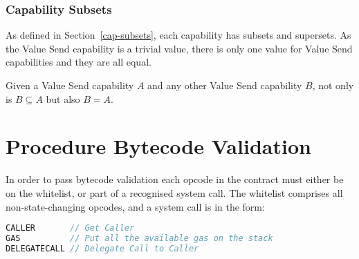 \documentclass[english,a4paper]{article}
\let\oldparagraph\subsubsection
\renewcommand{\subsubsection}[1]{\oldparagraph{#1}\mbox{}}
\begin{document}
\subsubsection{Capability Subsets}
As defined in Section~\ref{cap-subsets}, each capability has subsets and
supersets. As the Value Send capability is a trivial value, there is only one
value for Value Send capabilities and they are all equal.

Given a Value Send capability $A$ and any other Value Send capability $B$, not
only is $B \subseteq A$ but also $B = A$.

\section{Procedure Bytecode Validation}\label{bytecode-validation}
In order to pass bytecode validation each opcode in the contract must either be
on the whitelist, or part of a recognised system call. The whitelist comprises
all non-state-changing opcodes, and a system call is in the form:

\begin{minipage}{\linewidth}
\begin{lstlisting}[language=c,commentstyle=\color{mygreen},basicstyle=\ttfamily,
  identifierstyle=\color{blue},
  caption=Sequence of steps to perform a system call.]
CALLER       // Get Caller
GAS          // Put all the available gas on the stack
DELEGATECALL // Delegate Call to Caller
\end{lstlisting}
\end{minipage}
\end{document}
